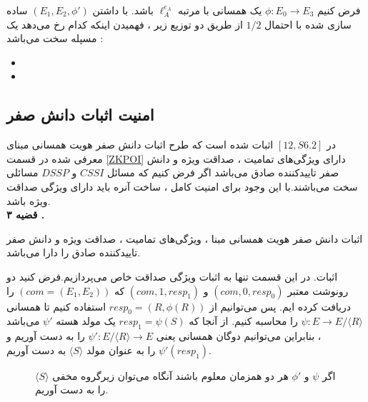 \documentclass[12pt,a4paper]{article}
\begin{document}
فرض کنیم
$\phi : E_0 \rightarrow E_3$
یک همسانی با مرتبه 
$\ell_A^{e_A}$
باشد. با داشتن
$(E_1 , E_2 , {\phi}' )$
 ساده سازی شده با احتمال 
 $1/2$
 از طریق دو توزیع زیر ، فهمیدن اینکه کدام رخ می‌دهد یک مسپله سخت می‌باشد :
 \begin{itemize}
 	
 	\item 
 	
 	\item 
 	
 \end{itemize}
 


\subsection{\bf امنیت اثبات دانش صفر}\label{zkp_security}


 در 
$[12,S 6.2]$
اثبات شده است که طرح اثبات دانش صفر هویت همسانی مبنای معرفی شده در قسمت 
\ref{ZKPOI}
دارای ویژگی‌های تمامیت ، صداقت ویژه و دانش صفر تاییدکننده صادق می‌باشد اگر فرض کنیم که مسائل 
$CSSI$
و
$DSSP$
مسائلی سخت می‌باشند.با این وجود برای امنیت کامل ، ساخت آنره باید دارای ویژگی صداقت ویژه باشد.\\

\textbf{قضیه ۳ .}

اثبات دانش صفر هویت همسانی مبنا ، ویژگی‌های تمامیت ، صداقت ویژه و دانش صفر تاییدکننده صادق را دارا می‌باشد.

اثبات. در این قسمت تنها به اثبات ویژگی صداقت خاص می‌پردازیم.فرض کنید دو رونوشت معتبر 
$(com,0,resp_0)$
و
$(com,1,resp_1)$
که 
$(com = (E_1,E_2))$
را دریافت کرده ایم. پس  می‌توانیم از
$resp_0 = (R,\phi(R))$
استفاده کنیم تا همسانی
$\psi : E \rightarrow E/ \langle R \rangle $
را محاسبه کنیم. از آنجا که 
$resp_1 = \psi(S)$
یک مولد هسته 
${\psi}'$
می‌باشد ، بنابراین می‌توانیم دوگان همسانی یعنی
${\psi}' : E/ \langle R \rangle \rightarrow E $
را به دست آوریم و 
${\psi}' (resp_1)$
را به عنوان مولد
$\langle S \rangle $
به دست آوریم.

\begin{figure}[H]
	\begin{center}
		
		
		\caption{
			اگر
			$\psi$
			و
			${\phi}'$    
			هر دو همزمان معلوم باشند آنگاه می‌توان زیرگروه مخفی 
			$\langle S \rangle$
			را به دست آوریم.
		}
		\label{}
		
	\end{center}
\end{figure}
\end{document}
